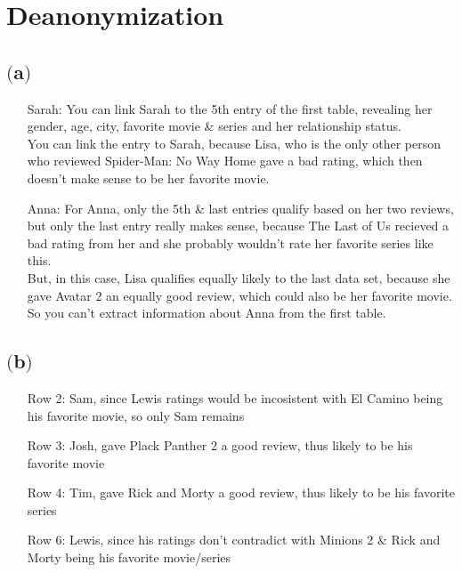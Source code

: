 



\section{Deanonymization}	

\subsection{$($a$)$}

\begin{itemize}
	\item[Sarah:] You can link Sarah to the 5th entry of the first table, revealing her gender, age, city, favorite movie \& series and her relationship status. \\
	You can link the entry to Sarah, because Lisa, who is the only other person who reviewed Spider-Man: No Way Home gave a bad rating, which then doesn't make sense to be her favorite movie.
	\item[Anna:] For Anna, only the 5th \& last entries qualify based on her two reviews, but only the last entry really makes sense, because The Last of Us recieved a bad rating from her and she probably wouldn't rate her favorite series like this.\\
	But, in this case, Lisa qualifies equally likely to the last data set, because she gave Avatar 2 an equally good review, which could also be her favorite movie. So you can't extract information about Anna from the first table.
\end{itemize}

\subsection{$($b$)$}

\begin{itemize}
	\item[Row 2:] Sam, since Lewis ratings would be incosistent with El Camino being his favorite movie, so only Sam remains
	\item[Row 3:] Josh, gave Plack Panther 2 a good review, thus likely to be his favorite movie	
	\item[Row 4:] Tim, gave Rick and Morty a good review, thus likely to be his favorite series
	\item[Row 6:] Lewis, since his ratings don't contradict with Minions 2 \& Rick and Morty being his favorite movie/series
\end{itemize}
	
